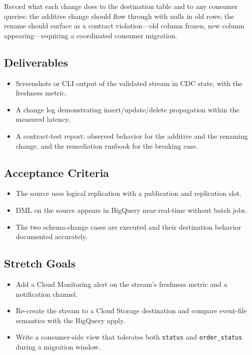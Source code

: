 Record what each change does to the destination table and to any consumer queries: the additive change should flow through with nulls in old rows; the rename should surface as a contract violation---old column frozen, new column appearing---requiring a coordinated consumer migration.

\subsection*{Deliverables}
\begin{itemize}
    \item Screenshots or CLI output of the validated stream in CDC state, with the freshness metric.
    \item A change log demonstrating insert/update/delete propagation within the measured latency.
    \item A contract-test report: observed behavior for the additive and the renaming change, and the remediation runbook for the breaking case.
\end{itemize}

\subsection*{Acceptance Criteria}
\begin{itemize}
    \item The source uses logical replication with a publication and replication slot.
    \item DML on the source appears in BigQuery near-real-time without batch jobs.
    \item The two schema-change cases are executed and their destination behavior documented accurately.
\end{itemize}

\subsection*{Stretch Goals}
\begin{itemize}
    \item Add a Cloud Monitoring alert on the stream's freshness metric and a notification channel.
    \item Re-create the stream to a Cloud Storage destination and compare event-file semantics with the BigQuery apply.
    \item Write a consumer-side view that tolerates both \texttt{status} and \texttt{order\_status} during a migration window.
\end{itemize}

